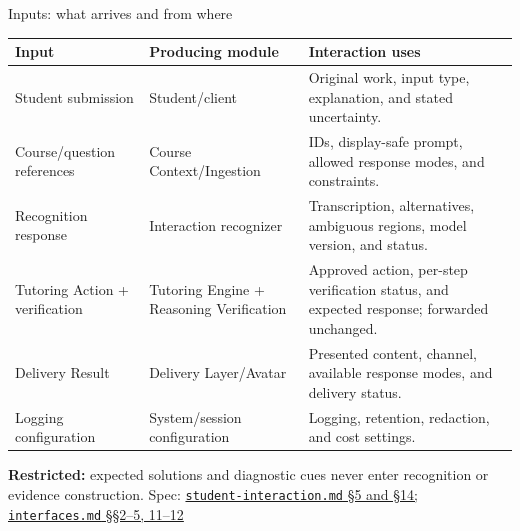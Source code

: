 \documentclass[aspectratio=169,10pt]{beamer}
\newcommand{\specnote}[2]{%
  \vfill\hfill{\tiny\color{Muted}Spec: \href{run:../../specs/#1}{\texttt{#1} #2}}}
\begin{document}
\begin{frame}{Inputs: what arrives and from where}
\footnotesize
\begin{tabularx}{\textwidth}{@{}P{.25\textwidth}P{.26\textwidth}Y@{}}
\toprule
\textbf{Input} & \textbf{Producing module} & \textbf{Interaction uses} \\
\midrule
Student submission & Student/client & Original work, input type, explanation, and stated uncertainty. \\
\addlinespace
Course/question references & Course Context/Ingestion & IDs, display-safe prompt, allowed response modes, and constraints. \\
\addlinespace
Recognition response & Interaction recognizer & Transcription, alternatives, ambiguous regions, model version, and status. \\
\addlinespace
Tutoring Action + verification & Tutoring Engine + Reasoning Verification & Approved action, per-step verification status, and expected response; forwarded unchanged. \\
\addlinespace
Delivery Result & Delivery Layer/Avatar & Presented content, channel, available response modes, and delivery status. \\
\addlinespace
Logging configuration & System/session configuration & Logging, retention, redaction, and cost settings. \\
\bottomrule
\end{tabularx}
\vspace{.35em}
\centering
\textbf{Restricted:} expected solutions and diagnostic cues never enter recognition or evidence construction.
\specnote{student-interaction.md}{\S5 and \S14; \texttt{interfaces.md} \S\S2--5, 11--12}
\end{frame}
\end{document}
